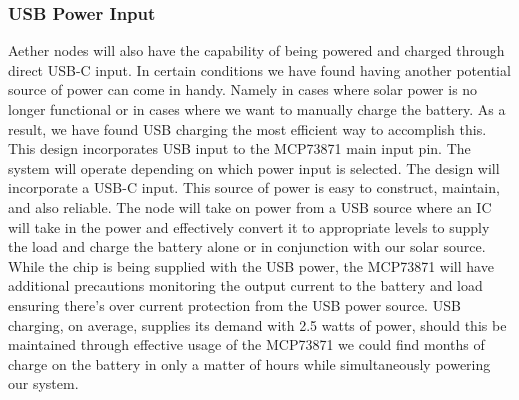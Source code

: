 \subsubsection{USB Power Input}
Aether nodes will also have the capability of being powered and charged through direct USB-C input. In certain conditions we have found having another potential source of power can come in handy. Namely in cases where solar power is no longer functional or in cases where we want to manually charge the battery. As a result, we have found USB charging the most efficient way to accomplish this. This design incorporates USB input to the MCP73871 main input pin. The system will operate depending on which power input is selected. The design will incorporate a USB-C input. This source of power is easy to construct, maintain, and also reliable. The node will take on power from a USB source where an IC will take in the power and effectively convert it to appropriate levels to supply the load and charge the battery alone or in conjunction with our solar source. While the chip is being supplied with the USB power, the MCP73871 will have additional precautions monitoring the output current to the battery and load ensuring there's over current protection from the USB power source. USB charging, on average, supplies its demand with 2.5 watts of power, should this be maintained through effective usage of the MCP73871 we could find months of charge on the battery in only a matter of hours while simultaneously powering our system.

